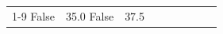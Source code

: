 \begin{table}[H]
\begin{tabular}{lllrlllll}
\cline{1-9}
False & 35.0%
\cline{1-9}
False & 37.5%

\end{tabular}
\end{table}

